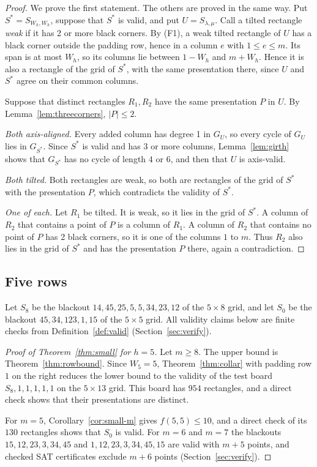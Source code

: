 \begin{proof}
We prove the first statement. The others are proved in the same way. Put
$S^*=S_{W_h,W_h}$, suppose that $S^*$ is valid, and put $U=S_{\lambda,\mu}$. Call a tilted
rectangle \emph{weak} if it has 2 or more black corners.
By (F1), a weak tilted rectangle of $U$ has a black corner outside the padding row, hence
in a column $e$ with $1\le e\le m$. Its span is at most $W_h$, so its columns lie between
$1-W_h$ and $m+W_h$. Hence it is also a rectangle of the grid of $S^*$, with the same
presentation there, since $U$ and $S^*$ agree on their common columns.

Suppose that distinct rectangles $R_1,R_2$ have the same presentation $P$ in $U$. By
Lemma~\ref{lem:threecorners}, $|P|\le2$.

\emph{Both axis-aligned.} Every added column has degree 1 in $G_U$, so every cycle of
$G_U$ lies in $G_{S^*}$. Since $S^*$ is valid and has 3 or more columns,
Lemma~\ref{lem:girth} shows that $G_{S^*}$ has no cycle of length $4$ or $6$, and then that
$U$ is axis-valid.

\emph{Both tilted.} Both rectangles are weak, so both are rectangles of the grid of $S^*$
with the presentation $P$, which contradicts the validity of $S^*$.

\emph{One of each.} Let $R_1$ be tilted. It is weak, so it lies in the grid of $S^*$. A
column of $R_2$ that contains a point of $P$ is a column of $R_1$. A column of $R_2$ that
contains no point of $P$ has 2 black corners, so it is one of the columns $1$ to $m$. Thus
$R_2$ also lies in the grid of $S^*$ and has the presentation $P$ there, again a
contradiction.
\end{proof}

\subsection{Five rows}

Let $S_8$ be the blackout $14,45,25,5,5,34,23,12$ of the $5\times8$ grid, and let $S_0$ be
the blackout $45,34,123,1,15$ of the $5\times5$ grid. All validity claims below are finite
checks from Definition~\ref{def:valid} (Section~\ref{sec:verify}).

\begin{proof}[Proof of Theorem~\ref{thm:small} for $h=5$]
Let $m\ge8$. The upper bound is Theorem~\ref{thm:rowbound}. Since $W_5=5$,
Theorem~\ref{thm:collar} with padding row $1$ on the right reduces the lower bound to the
validity of the test board $S_8,1,1,1,1,1$ on the $5\times13$ grid. This board has $954$
rectangles, and a direct check shows that their presentations are distinct.

For $m=5$, Corollary~\ref{cor:small-m} gives $f(5,5)\le10$, and a direct check of its $130$
rectangles shows that $S_0$ is valid. For $m=6$ and $m=7$ the blackouts
$15,12,23,3,34,45$ and $1,12,23,3,34,45,15$ are valid with $m+5$ points, and checked SAT
certificates exclude $m+6$ points (Section~\ref{sec:verify}).
\end{proof}


